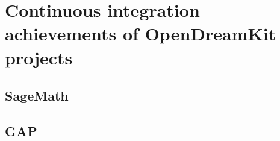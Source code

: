 \documentclass{deliverablereport}
\begin{document}
\hypertarget{project-reports}{%
\section{Continuous integration achievements of OpenDreamKit projects}\label{project-reports}}

\subsection{SageMath}


\subsection{GAP}

% 
\end{document}
